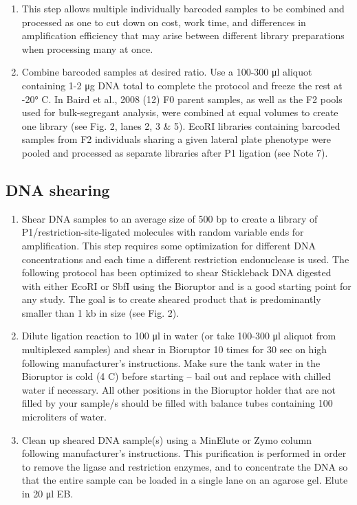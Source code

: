 \documentclass[
  letterpaper,
  DIV=11,
  numbers=noendperiod]{scrreprt}
\providecommand{\tightlist}{%
  \setlength{\itemsep}{0pt}\setlength{\parskip}{0pt}}\usepackage{longtable,booktabs,array}
\begin{document}
\begin{enumerate}
\def\labelenumi{\arabic{enumi}.}
\tightlist
\item
  This step allows multiple individually barcoded samples to be combined
  and processed as one to cut down on cost, work time, and differences
  in amplification efficiency that may arise between different library
  preparations when processing many at once.
\item
  Combine barcoded samples at desired ratio. Use a 100-300 μl aliquot
  containing 1-2 μg DNA total to complete the protocol and freeze the
  rest at -20° C. In Baird et al., 2008 (12) F0 parent samples, as well
  as the F2 pools used for bulk-segregant analysis, were combined at
  equal volumes to create one library (see Fig. 2, lanes 2, 3 \& 5).
  EcoRI libraries containing barcoded samples from F2 individuals
  sharing a given lateral plate phenotype were pooled and processed as
  separate libraries after P1 ligation (see Note 7).
\end{enumerate}

\hypertarget{dna-shearing-1}{%
\subsection{DNA shearing}\label{dna-shearing-1}}

\begin{enumerate}
\def\labelenumi{\arabic{enumi}.}
\tightlist
\item
  Shear DNA samples to an average size of 500 bp to create a library of
  P1/restriction-site-ligated molecules with random variable ends for
  amplification. This step requires some optimization for different DNA
  concentrations and each time a different restriction endonuclease is
  used. The following protocol has been optimized to shear Stickleback
  DNA digested with either EcoRI or SbfI using the Bioruptor and is a
  good starting point for any study. The goal is to create sheared
  product that is predominantly smaller than 1 kb in size (see Fig. 2).
\item
  Dilute ligation reaction to 100 μl in water (or take 100-300 μl
  aliquot from multiplexed samples) and shear in Bioruptor 10 times for
  30 sec on high following manufacturer's instructions. Make sure the
  tank water in the Bioruptor is cold (4 C) before starting -- bail out
  and replace with chilled water if necessary. All other positions in
  the Bioruptor holder that are not filled by your sample/s should be
  filled with balance tubes containing 100 microliters of water.
\item
  Clean up sheared DNA sample(s) using a MinElute or Zymo column
  following manufacturer's instructions. This purification is performed
  in order to remove the ligase and restriction enzymes, and to
  concentrate the DNA so that the entire sample can be loaded in a
  single lane on an agarose gel. Elute in 20 μl EB.
\end{enumerate}
\end{document}
